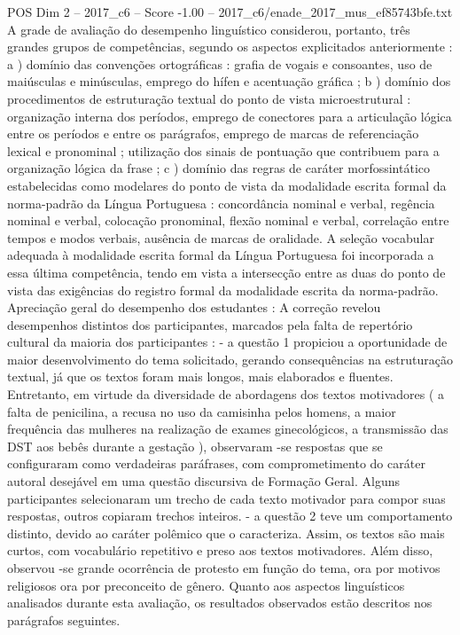 \begin{textsample}{POS Dim 2 – 2017\_c6 – Score -1.00 – 2017\_c6/enade\_2017\_mus\_ef85743bfe.txt}
A grade de avaliação do desempenho linguístico considerou, portanto, três grandes grupos de competências, segundo os aspectos explicitados anteriormente : a ) domínio das convenções ortográficas : grafia de vogais e consoantes, uso de maiúsculas e minúsculas, emprego do hífen e acentuação gráfica ; b ) domínio dos procedimentos de estruturação textual do ponto de vista microestrutural : organização interna dos períodos, emprego de conectores para a articulação lógica entre os períodos e entre os parágrafos, emprego de marcas de referenciação lexical e pronominal ; utilização dos sinais de pontuação que contribuem para a organização lógica da frase ; c ) domínio das regras de caráter morfossintático estabelecidas como modelares do ponto de vista da modalidade escrita formal da norma-padrão da Língua Portuguesa : concordância nominal e verbal, regência nominal e verbal, colocação pronominal, flexão nominal e verbal, correlação entre tempos e modos verbais, ausência de marcas de oralidade.
A seleção vocabular adequada à modalidade escrita formal da Língua Portuguesa foi incorporada a essa última competência, tendo em vista a intersecção entre as duas do ponto de vista das exigências do registro formal da modalidade escrita da norma-padrão.
Apreciação geral do desempenho dos estudantes : A correção revelou desempenhos distintos dos participantes, marcados pela falta de repertório cultural da maioria dos participantes : - a questão 1 propiciou a oportunidade de maior desenvolvimento do tema solicitado, gerando consequências na estruturação textual, já que os textos foram mais longos, mais elaborados e fluentes.
Entretanto, em virtude da diversidade de abordagens dos textos motivadores ( a falta de penicilina, a recusa no uso da camisinha pelos homens, a maior frequência das mulheres na realização de exames ginecológicos, a transmissão das DST aos bebês durante a gestação ), observaram -se respostas que se configuraram como verdadeiras paráfrases, com comprometimento do caráter autoral desejável em uma questão discursiva de Formação Geral.
Alguns participantes selecionaram um trecho de cada texto motivador para compor suas respostas, outros copiaram trechos inteiros. - a questão 2 teve um comportamento distinto, devido ao caráter polêmico que o caracteriza.
Assim, os textos são mais curtos, com vocabulário repetitivo e preso aos textos motivadores.
Além disso, observou -se grande ocorrência de protesto em função do tema, ora por motivos religiosos ora por preconceito de gênero.
Quanto aos aspectos linguísticos analisados durante esta avaliação, os resultados observados estão descritos nos parágrafos seguintes.

\end{textsample}
